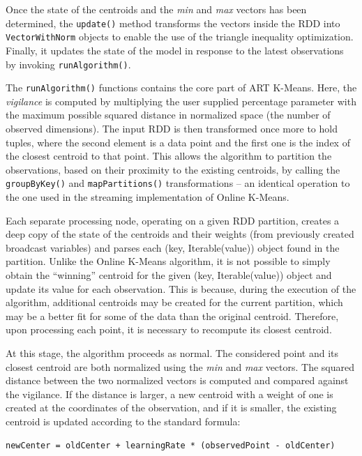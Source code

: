 \documentclass{l4proj}
\begin{document}
Once the state of the centroids and the \textit{min} and \textit{max} vectors has been determined, the \texttt{update()} method transforms the vectors inside the RDD into \texttt{VectorWithNorm} objects to enable the use of the triangle inequality optimization\cite{Triangle}. Finally, it updates the state of the model in response to the latest observations by invoking \texttt{runAlgorithm()}.

The \texttt{runAlgorithm()} functions contains the core part of ART K-Means. Here, the \textit{vigilance} is computed by multiplying the user supplied percentage parameter with the maximum possible squared distance in normalized space (the number of observed dimensions). The input RDD is then transformed once more to hold tuples, where the second element is a data point and the first one is the index of the closest centroid to that point. This allows the algorithm to partition the observations, based on their proximity to the existing centroids, by calling the \texttt{groupByKey()} and \texttt{mapPartitions()} transformations -- an identical operation to the one used in the streaming implementation of Online K-Means.

Each separate processing node, operating on a given RDD partition, creates a deep copy of the state of the centroids and their weights (from previously created broadcast variables) and parses each (key, Iterable(value)) object found in the partition. Unlike the Online K-Means algorithm, it is not possible to simply obtain the ``winning'' centroid for the given (key, Iterable(value)) object and update its value for each observation. This is because, during the execution of the algorithm, additional centroids may be created for the current partition, which may be a better fit for some of the data than the original centroid. Therefore, upon processing each point, it is necessary to recompute its closest centroid. 

At this stage, the algorithm proceeds as normal. The considered point and its closest centroid are both normalized using the \textit{min} and \textit{max} vectors. The squared distance between the two normalized vectors is computed and compared against the vigilance. If the distance is larger, a new centroid with a weight of one is created at the coordinates of the observation, and if it is smaller, the existing centroid is updated according to the standard formula:

\begin{center}
\begin{BVerbatim}
newCenter = oldCenter + learningRate * (observedPoint - oldCenter)
\end{BVerbatim}
\end{center}
\end{document}

